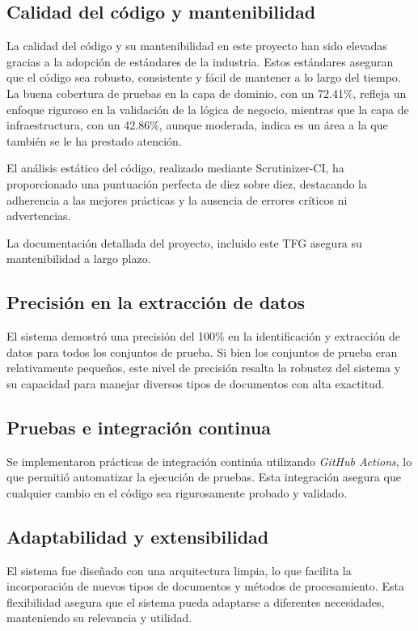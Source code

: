 \subsection*{Calidad del código y mantenibilidad}

La calidad del código y su mantenibilidad en este proyecto han sido elevadas gracias a la adopción de estándares de la
industria.
Estos estándares aseguran que el código sea robusto, consistente y fácil de mantener a lo largo del tiempo.
La buena cobertura de pruebas en la capa de dominio, con un 72.41\%, refleja un enfoque riguroso en la validación de la
lógica de negocio, mientras que la capa de infraestructura, con un 42.86\%, aunque moderada, indica es un área a la
que también se le ha prestado atención.

El análisis estático del código, realizado mediante Scrutinizer-CI, ha proporcionado una puntuación perfecta de diez
sobre diez, destacando la adherencia a las mejores prácticas y la ausencia de errores críticos ni advertencias.

La documentación detallada del proyecto, incluido este TFG asegura su mantenibilidad a largo plazo.

\subsection*{Precisión en la extracción de datos}

El sistema demostró una precisión del 100\% en la identificación y extracción de datos para todos los conjuntos de
prueba.
Si bien los conjuntos de prueba eran relativamente pequeños, este nivel de precisión resalta la robustez del sistema y
su capacidad para manejar diversos tipos de documentos con alta exactitud.

\subsection*{Pruebas e integración continua}

Se implementaron prácticas de integración continúa utilizando \textit{GitHub Actions}, lo que permitió automatizar la
ejecución de pruebas.
Esta integración asegura que cualquier cambio en el código sea rigurosamente probado y validado.

\subsection*{Adaptabilidad y extensibilidad}

El sistema fue diseñado con una arquitectura limpia, lo que facilita la incorporación de nuevos tipos de documentos y
métodos de procesamiento.
Esta flexibilidad asegura que el sistema pueda adaptarse a diferentes necesidades, manteniendo su relevancia y utilidad.